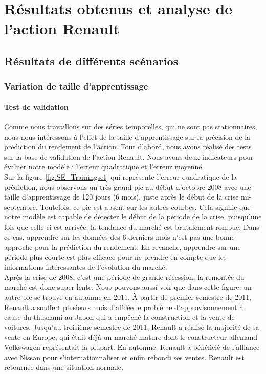 
\section{Résultats obtenus et analyse de l'action Renault}
 
\subsection{Résultats de différents scénarios}

\subsubsection{Variation de taille d'apprentissage}

\paragraph{Test de validation}
Comme nous travaillons sur des séries temporelles, qui ne sont pas stationnaires, nous nous intéressons à l'effet de la taille d'apprentissage sur la précision de la prédiction du rendement de l'action. Tout d'abord, nous avons réalisé des tests sur la base de validation de l'action Renault. Nous avons deux indicateurs pour évaluer notre modèle : l'erreur quadratique et l'erreur moyenne. \\

Sur la figure \ref{fig:SE_Trainingset} qui représente l'erreur quadratique de la prédiction, nous observons un très grand pic au début d'octobre 2008 avec une taille d'apprentissage de 120 jours (6 mois), juste après le début de la crise mi-septembre. Toutefois, ce pic est absent sur les autres courbes. Cela signifie que notre modèle est capable de détecter le début de la période de la crise, puisqu'une fois que celle-ci est arrivée, la tendance du marché est brutalement rompue. Dans ce cas, apprendre sur les données des 6 derniers mois n'est pas une bonne approche pour la prédiction du rendement. En revanche, apprendre sur une période plus courte est plus efficace pour ne prendre en compte que les informations intéressantes de l'évolution du marché.\\

Après la crise de 2008, c'est une période de grande récession, la remontée du marché est donc super lente. Nous pouvons aussi voir que dans cette figure, un autre pic se trouve en automne en 2011. À partir de premier semestre de 2011, Renault a souffert plusieurs mois d'affilée le problème d'approvisonnement à cause du thusnami au Japon qui a empêché la construction et la vente de voitures. Jusqu'au troisième semestre de 2011, Renault a réalisé la majorité de sa vente en Europe, qui était déjà un marché mature dont le constructeur allemand Volkswagen représentait la plupart. En autonme, Renault a bénéficié de l'alliance avec Nissan pour s'internationnaliser et enfin rebondi ses ventes. Renault est retournée dans une situation normale.\\

